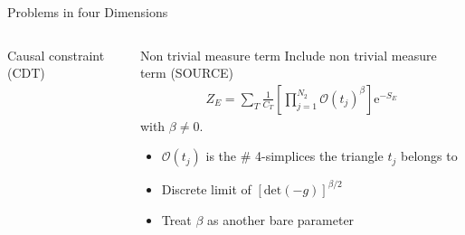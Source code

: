 \begin{frame}{Problems in four Dimensions}
 \begin{columns}[onlytextwidth,t]
  \begin{column}{0.48\textwidth}
   \begin{block}{Causal constraint (CDT)}
    \vspace{0pt}
   \end{block}
  \end{column}
  \begin{column}{0.48\textwidth}
   \begin{block}{Non trivial measure term}
    \vspace{0pt}
    Include non trivial measure term (SOURCE)
    \begin{align*}
     Z_E = \sum_T \frac{1}{C_T} \left[ \prod_{j=1}^{N_2} \mathcal{O} \left( t_j \right)^\beta \right] \mathrm{e}^{-S_E}
    \end{align*}
    with $\beta \neq 0$.
    \begin{itemize}
     \item $\mathcal{O}(t_j)$ is the \# 4-simplices the triangle $t_j$ belongs to
     \item Discrete limit of $\displaystyle \left[ \mathrm{det} (-g) \right]^{\beta/2}$
     \item Treat $\beta$ as another bare parameter
    \end{itemize}
   \end{block}
  \end{column}
 \end{columns}
\end{frame}
